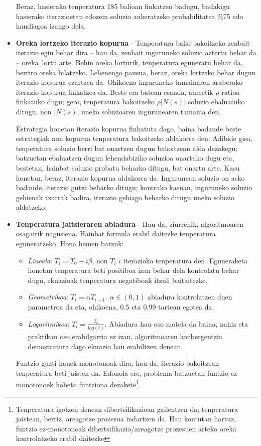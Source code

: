\documentclass[eu]{ifirak}\usepackage[]{graphicx}\usepackage[]{color}
\newcommand{\zkk}{\guillemotleft}
\newcommand{\skk}{\guillemotright}
\begin{document}
\begin{itemize}
\begin{tcolorbox}
\begin{ifexample}
Beraz, hasierako tenperatura 185 balioan finkatzen badugu, badakigu hasierako iterazioetan edozein soluzio aukeratzeko probabilitatea \%75 edo handiagoa izango dela.
\end{ifexample}
\end{tcolorbox}

\item \textbf{Oreka lortzeko iterazio kopurua} - Tenperatura balio bakoitzeko zenbait iterazio egin behar dira -- hau da, zenbait inguruneko soluzio aztertu behar da -- \zkk oreka\skk\ lortu arte. Behin oreka lorturik, tenperatura eguneratu behar da, berriro oreka bilatzeko. Lehenengo pausua, beraz, oreka lortzeko behar dugun iterazio kopurua ezartzea da. Ohikoena inguruneko tamainaren araberako iterazio kopurua finkatzea da. Beste era batean esanda, aurretik $\rho$ ratioa finkatuko dugu; gero, tenperatura bakoitzeko $\rho|N(s)|$ soluzio ebaluatuko ditugu, non $|N(s)|$ uneko soluzioaren ingurunearen tamaina den. 

Estrategia honetan iterazio kopurua finkatuta dago, baina badaude beste estrategiak non kopurua tenperatura bakoitzeko aldakorra den. Adibide gisa, tenperatura soluzio berri bat onartzen dugun bakoitzean alda dezakegu; batzuetan ebaluatzen dugun lehendabiziko soluzioa onartuko dugu eta, bestetan, hainbat soluzio probatu beharko ditugu, bat onartu arte. Kasu honetan, beraz, iterazio kopurua aldakorra da. Ingurunean soluzio on asko badaude, iterazio gutxi beharko ditugu; kontrako kasuan, inguruneko soluzio gehienak txarrak badira, iterazio gehiago beharko ditugu uneko soluzio aldatzeko.

\item \textbf{Tenperatura jaitsieraren abiadura} - Hau da, ziurrenik, algoritmoaren osagairik nagusiena. Hainbat formula erabil daitezke tenperatura eguneratzeko. Hona hemen batzuk:
  \begin{itemize}
  \item \textit{Lineala}: $T_i=T_0 - i\beta$, non $T_i$ $i$ iterazioko tenperatura den. Eguneraketa honetan tenperatura beti positiboa izan behar dela kontrolatu behar dugu, ekuazioak tenperatura negatiboak itzuli baitaitezke.
  \item \textit{Geometrikoa}: $T_i = \alpha T_{i-1}$. $\alpha \in (0,1)$ abiadura kontrolatzen duen parametroa da eta, ohikoena, 0.5 eta 0.99 tartean egotea da.
  \item \textit{Logaritmikoa}: $T_i=\frac{T_0}{log(i)}$. Abiadura hau oso motela da baina, nahiz eta praktikan oso erabilgarria ez izan, algoritmoaren konbergentzia demostratuta dago ekuazio hau erabiltzen denean.
\end{itemize}
Funtzio guzti hauek monotonoak dira, hau da, iterazio bakoitzean tenperatura beti jaisten da. Edonola ere, problema batzuetan funtzio ez-monotonoek hobeto funtziona dezakete\footnote{Tenperatura igotzen denean dibertsifikazioan gailentzen da; tenperatura jaistean, berriz, areagotze prozesua indartzen da. Hau kontutan hartuz, funtzio ez-monotonoak dibertsifikazio/areagotze prozesuen arteko oreka kontrolatzeko erabil daitezke}.


\end{itemize}
\end{document}
